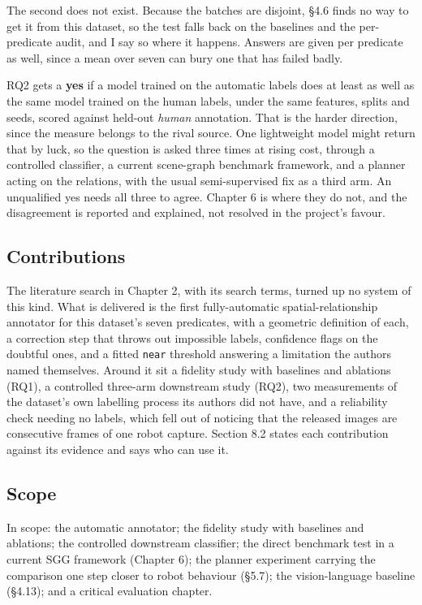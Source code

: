The second does not exist. Because the batches are disjoint, \S{}4.6 finds no way to get it from this dataset, so the test falls back on the baselines and the per-predicate audit, and I say so where it happens. Answers are given per predicate as well, since a mean over seven can bury one that has failed badly.

RQ2 gets a \textbf{yes} if a model trained on the automatic labels does at least as well as the same model trained on the human labels, under the same features, splits and seeds, scored against held-out \textit{human} annotation. That is the harder direction, since the measure belongs to the rival source. One lightweight model might return that by luck, so the question is asked three times at rising cost, through a controlled classifier, a current scene-graph benchmark framework, and a planner acting on the relations, with the usual semi-supervised fix as a third arm. An unqualified yes needs all three to agree. Chapter 6 is where they do not, and the disagreement is reported and explained, not resolved in the project's favour.

\subsection{Contributions}

The literature search in Chapter 2, with its search terms, turned up no system of this kind. What is delivered is the first fully-automatic spatial-relationship annotator for this dataset's seven predicates, with a geometric definition of each, a correction step that throws out impossible labels, confidence flags on the doubtful ones, and a fitted \texttt{near} threshold answering a limitation the authors named themselves. Around it sit a fidelity study with baselines and ablations (RQ1), a controlled three-arm downstream study (RQ2), two measurements of the dataset's own labelling process its authors did not have, and a reliability check needing no labels, which fell out of noticing that the released images are consecutive frames of one robot capture. Section 8.2 states each contribution against its evidence and says who can use it.

\subsection{Scope}

In scope: the automatic annotator; the fidelity study with baselines and ablations; the controlled downstream classifier; the direct benchmark test in a current SGG framework (Chapter 6); the planner experiment carrying the comparison one step closer to robot behaviour (\S{}5.7); the vision-language baseline (\S{}4.13); and a critical evaluation chapter.

